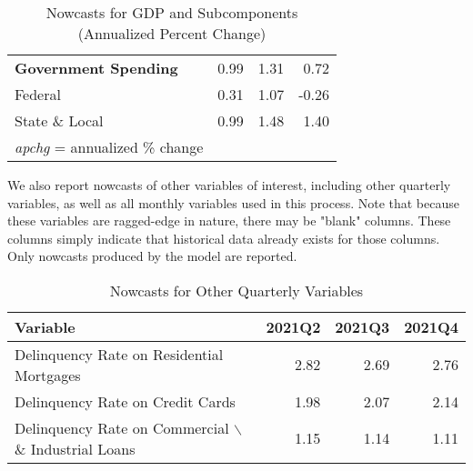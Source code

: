 \documentclass[11pt, letterpaper]{article}\usepackage[]{graphicx}\usepackage[]{color}
\begin{document}
\begin{table}[H]
\begin{tabular}{lrrr}
  \hspace{0mm} \textbf{Government Spending} & 0.99 & 1.31 & 0.72 \\ 
  \hspace{8mm}  Federal & 0.31 & 1.07 & -0.26 \\ 
  \hspace{8mm}  State \& Local & 0.99 & 1.48 & 1.40 \\ 
   \hline 
 \textit{apchg} = annualized \% change 
\end{tabular}
\endgroup
\caption{Nowcasts for GDP and Subcomponents (Annualized Percent Change)} 
\end{table}


We also report nowcasts of other variables of interest, including other quarterly variables, as well as all monthly variables used in this process. Note that because these variables are ragged-edge in nature, there may be "blank" columns. These columns simply indicate that historical data already exists for those columns. Only nowcasts produced by the model are reported.
\begin{table}[H]
\centering
\begingroup\fontsize{11pt}{13pt}\selectfont
\begin{tabular}{lrrr}
  \hline
Variable & 2021Q2 & 2021Q3 & 2021Q4 \\ 
  \hline
Delinquency Rate on Residential Mortgages & 2.82 & 2.69 & 2.76 \\ 
  Delinquency Rate on Credit Cards & 1.98 & 2.07 & 2.14 \\ 
  Delinquency Rate on Commercial $\backslash$\& Industrial Loans & 1.15 & 1.14 & 1.11 \\ 
   \hline
\end{tabular}
\endgroup
\caption{Nowcasts for Other Quarterly Variables} 
\end{table}
\end{document}
